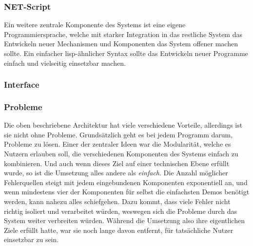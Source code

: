\documentclass[11pt]{article}
\begin{document}
\subsubsection{NET-Script}
\label{sec:org08e246d}
Ein weitere zentrale Komponente des Systems ist eine eigene
Programmiersprache, welche mit starker Integration in das restliche
System das Entwickeln neuer Mechanismen und Komponenten das System
offener machen sollte. Ein einfacher lisp-ähnlicher Syntax sollte das
Entwickeln neuer Programme einfach und vielseitig einsetzbar machen.
\subsubsection{Interface}
\label{sec:orgfc52f04}
\subsubsection{Probleme}
\label{sec:orge0a8736}
Die oben beschriebene Architektur hat viele verschiedene Vorteile,
allerdings ist sie nicht ohne Probleme. Grundsätzlich geht es bei
jedem Programm darum, Probleme zu lösen. Einer der zentraler Ideen war
die Modularität, welche es Nutzern erlauben soll, die verschiedenen
Komponenten des Systems einfach zu kombinieren. Und auch wenn dieses
Ziel auf einer technischen Ebene erfüllt wurde, so ist die Umsetzung
alles andere als \emph{einfach}. Die Anzahl möglicher Fehlerquellen steigt
mit jedem eingebundenen Komponenten exponentiell an, und wenn
mindestens vier der Komponenten für selbst die einfachsten Demos
benötigt werden, kann nahezu alles schiefgehen. Dazu kommt, dass viele
Fehler nicht richtig isoliert und verarbeitet würden, weswegen sich
die Probleme durch das System weiter verbreiten würden. Während die
Umsetzung also ihre eigentlichen Ziele erfüllt hatte, war sie noch
lange davon entfernt, für tatsächliche Nutzer einsetzbar zu sein.\\
\end{document}
